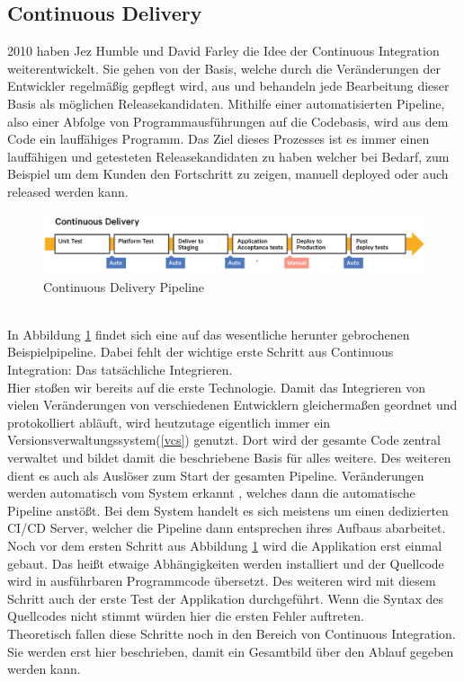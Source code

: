 \subsection{Continuous Delivery}
2010 haben Jez Humble und David Farley\autocite{Farley.2010} die Idee der Continuous Integration weiterentwickelt. Sie gehen von der Basis, welche durch die Veränderungen der Entwickler regelmäßig gepflegt wird, aus und behandeln jede Bearbeitung dieser Basis als möglichen Releasekandidaten.\autocite[Vgl.][S.5]{Stahl.2018} Mithilfe einer automatisierten Pipeline, also einer Abfolge von Programmausführungen auf die Codebasis, wird aus dem Code ein lauffähiges Programm. Das Ziel dieses Prozesses ist es immer einen lauffähigen und getesteten Releasekandidaten zu haben welcher bei Bedarf, zum Beispiel um dem Kunden den Fortschritt zu zeigen, manuell deployed oder auch released werden kann.\autocite[Vgl.][S.16]{Stahl.2018}
\begin{figure}[h!]
	\centering
	\includegraphics[scale = 0.3]{img/CDE.png}
	\caption{Continuous Delivery Pipeline}
	\label{img:cde}
\end{figure}\\
In Abbildung \ref{img:cde} findet sich eine auf das wesentliche herunter gebrochenen Beispielpipeline. Dabei fehlt der wichtige erste Schritt aus Continuous Integration: Das tatsächliche Integrieren.\\ Hier stoßen wir bereits auf die erste Technologie. Damit das Integrieren von vielen Veränderungen von verschiedenen Entwicklern gleichermaßen geordnet und protokolliert abläuft, wird heutzutage eigentlich immer ein Versionsverwaltungssystem(\ref{vcs}) genutzt.\autocite[Vgl.][S.2]{Arachchi.2018} Dort wird der gesamte Code zentral verwaltet und bildet damit die beschriebene Basis für alles weitere. Des weiteren dient es auch als Auslöser zum Start der gesamten Pipeline. Veränderungen werden automatisch vom System erkannt , welches dann die automatische Pipeline anstößt. Bei dem System handelt es sich meistens um einen dedizierten CI/CD Server, welcher die Pipeline dann entsprechen ihres Aufbaus abarbeitet.\autocite[Vgl.][S.2]{Meyer.2014}\\ Noch vor dem ersten Schritt aus Abbildung \ref{img:cde} wird die Applikation erst einmal gebaut. Das heißt etwaige Abhängigkeiten werden installiert und der Quellcode wird in ausführbaren Programmcode übersetzt.\autocite[Vgl.][S.36]{Farley.2010} Des weiteren wird mit diesem Schritt auch der erste Test der Applikation durchgeführt. Wenn die Syntax des Quellcodes nicht stimmt würden hier die ersten Fehler auftreten.\autocite[Vgl.][S.37]{Farley.2010}\\ Theoretisch fallen diese Schritte noch in den Bereich von Continuous Integration. Sie werden erst hier beschrieben, damit ein Gesamtbild über den Ablauf gegeben werden kann.\\
